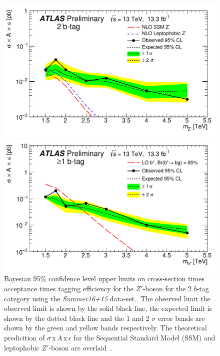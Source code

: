 \begin{figure}[!ht]
  \centering
   \includegraphics[width=0.75\linewidth, angle=0]{figs/Dibjet/ICHEP/lim-zprime.pdf}
   \caption[Bayesian 95\% confidence level upper limits on cross-section times acceptance times tagging efficiency
    for the $Z'$-boson for the 2 $b$-tag category using the \textit{Summer16+15} data-set.
    The observed limit the observed limit is shown by the solid black line,
    the expected limit is shown by the dotted black line
    and the 1 and 2 $\sigma$ error bands are shown by the green and yellow bands respectively.
    The theoretical predicition of $\sigma\,\text{x}\,\mathit{A}\,\text{x}\,\epsilon$
    for the Sequential Standard Model (SSM) and leptophobic $Z'$-boson are overlaid.]
           {Bayesian 95\% confidence level upper limits on cross-section times acceptance times tagging efficiency
    for the $Z'$-boson for the 2 $b$-tag category using the \textit{Summer16+15} data-set..
    The observed limit the observed limit is shown by the solid black line,
    the expected limit is shown by the dotted black line
    and the 1 and 2 $\sigma$ error bands are shown by the green and yellow bands respectively.
    The theoretical predicition of $\sigma\,\text{x}\,\mathit{A}\,\text{x}\,\epsilon$
    for the Sequential Standard Model (SSM) and leptophobic $Z'$-boson are overlaid~\cite{dibjet-ichep_conf}.
  }
  \label{fig:lim-summer_zprime}
  \vspace{1cm}
  \centering
   \includegraphics[width=0.75\linewidth, angle=0]{figs/Dibjet/ICHEP/lim-bstar.pdf}

\end{figure}

